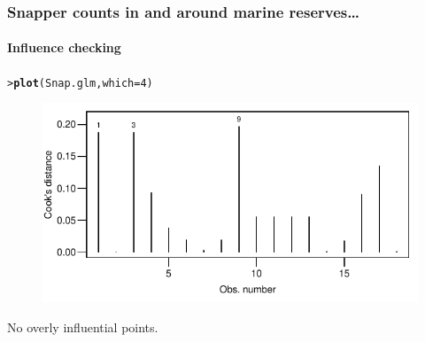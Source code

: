 \documentclass{beamer}\usepackage[]{graphicx}\usepackage[]{xcolor}
\makeatletter
\newcommand{\hlnum}[1]{\textcolor[rgb]{0.686,0.059,0.569}{#1}}%
\newcommand{\hlstd}[1]{\textcolor[rgb]{0.345,0.345,0.345}{#1}}%
\newcommand{\hlkwc}[1]{\textcolor[rgb]{0.333,0.667,0.333}{#1}}%
\newcommand{\hlkwd}[1]{\textcolor[rgb]{0.737,0.353,0.396}{\textbf{#1}}}%
\newenvironment{kframe}{%
 \def\at@end@of@kframe{}%
 \ifinner\ifhmode%
  \def\at@end@of@kframe{\end{minipage}}%
  \begin{minipage}{\columnwidth}%
 \fi\fi%
 \def\FrameCommand##1{\hskip\@totalleftmargin \hskip-\fboxsep
 \colorbox{shadecolor}{##1}\hskip-\fboxsep
     \hskip-\linewidth \hskip-\@totalleftmargin \hskip\columnwidth}%
 \MakeFramed {\advance\hsize-\width
   \@totalleftmargin\z@ \linewidth\hsize
   \@setminipage}}%
 {\par\unskip\endMakeFramed%
 \at@end@of@kframe}
\newenvironment{knitrout}{}{} %
\makeatother
\begin{document}
\begin{frame}[fragile]
\frametitle{Snapper counts in and around marine reserves\ldots}
\framesubtitle{Influence checking}

\begin{knitrout}\scriptsize
{}\color{fgcolor}\begin{kframe}
\begin{alltt}
\hlstd{> }\hlkwd{plot}\hlstd{(Snap.glm,} \hlkwc{which} \hlstd{=} \hlnum{4}\hlstd{)}
\end{alltt}
\end{kframe}
\end{knitrout}



\begin{figure}
  \centering
  \includegraphics[scale=0.9]{figure/RC-H14-017b}
\end{figure}

No overly influential points.
\end{frame}
\end{document}
